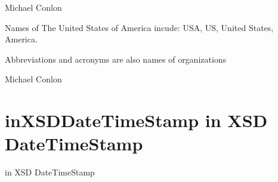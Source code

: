 \documentclass[letterpaper,10pt,english]{sphinxmanual}
\begin{document}
\begin{sphinxShadowBox}

\sphinxAtStartPar
Michael Conlon 
\end{sphinxShadowBox}

\begin{sphinxShadowBox}

\sphinxAtStartPar
Names of The United States of America incude: USA, US, United States, America.
\end{sphinxShadowBox}

\begin{sphinxShadowBox}

\sphinxAtStartPar
Abbreviations and acronyms are also names of organizations
\end{sphinxShadowBox}

\begin{sphinxShadowBox}

\sphinxAtStartPar
Michael Conlon 
\end{sphinxShadowBox}
\begin{quote}
\label{\detokenize{doc-inXSDDateTimeStamp:inxsddatetimestamp}}\label{\detokenize{doc-inXSDDateTimeStamp:in-xsd-date-time-stamp}}\label{\detokenize{doc-inXSDDateTimeStamp:inxsddatetimestamp}}
\ignorespaces \end{quote}


\section{inXSDDateTimeStamp \sphinxhyphen{} in XSD Date\sphinxhyphen{}Time\sphinxhyphen{}Stamp}
\label{\detokenize{doc-inXSDDateTimeStamp:inxsddatetimestamp-in-xsd-date-time-stamp}}\label{\detokenize{doc-inXSDDateTimeStamp:index-0}}\label{\detokenize{doc-inXSDDateTimeStamp::doc}}
\begin{sphinxShadowBox}

\sphinxAtStartPar
in XSD Date\sphinxhyphen{}Time\sphinxhyphen{}Stamp
\end{sphinxShadowBox}
\end{document}
